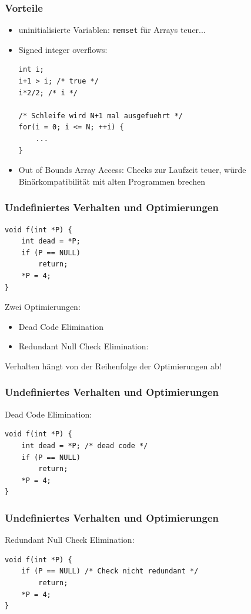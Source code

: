 \documentclass[12pt,compress]{beamer}
\begin{document}
\begin{frame}[fragile]
\frametitle{Vorteile}

\begin{itemize}
\item uninitialisierte Variablen: \texttt{memset} für Arrays teuer...
\item Signed integer overflows:
\begin{lstlisting}
int i;
i+1 > i; /* true */ 
i*2/2; /* i */

/* Schleife wird N+1 mal ausgefuehrt */
for(i = 0; i <= N; ++i) {
	...
}
\end{lstlisting}
\item Out of Bounds Array Access: Checks zur Laufzeit teuer, würde Binärkompatibilität mit alten Programmen brechen
\end{itemize}
\end{frame}


\begin{frame}[fragile]
\frametitle{Undefiniertes Verhalten und Optimierungen}

\begin{lstlisting}
void f(int *P) {
    int dead = *P;
    if (P == NULL)
        return;
    *P = 4;
}
\end{lstlisting}

\vfill
Zwei Optimierungen:
\begin{itemize}
\item Dead Code Elimination
\item Redundant Null Check Elimination:
\end{itemize}

\vfill

Verhalten hängt von der Reihenfolge der Optimierungen ab!
\end{frame}


\begin{frame}[fragile]
\frametitle{Undefiniertes Verhalten und Optimierungen}

Dead Code Elimination:

\vfill

\begin{lstlisting}
void f(int *P) {
    int dead = *P; /* dead code */
    if (P == NULL)
        return;
    *P = 4;
}
\end{lstlisting}
\end{frame}


\begin{frame}[fragile]
\frametitle{Undefiniertes Verhalten und Optimierungen}

Redundant Null Check Elimination:

\vfill

\begin{lstlisting}
void f(int *P) {
    if (P == NULL) /* Check nicht redundant */
        return;
    *P = 4;
}
\end{lstlisting}
\end{frame}
\end{document}
